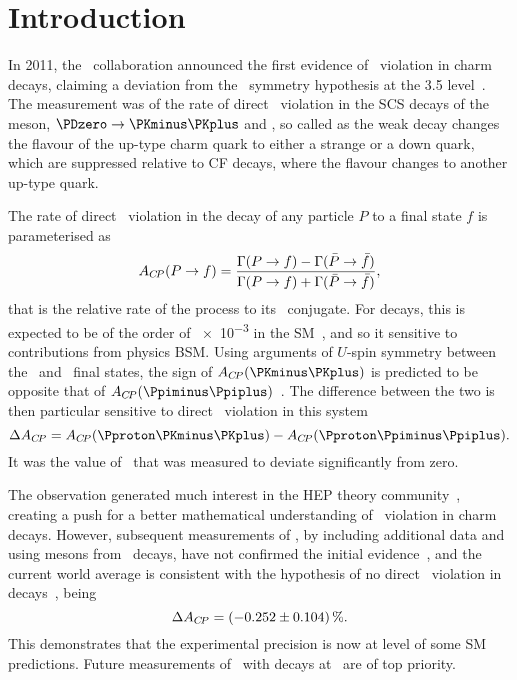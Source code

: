 \chapter{Introduction}
\label{chap:cpv:introduction}

In 2011, the \lhcb\ collaboration announced the first evidence of \CP\ 
violation in charm decays, claiming a deviation from the \CP\ symmetry 
hypothesis at the
\SI{3.5}{\sigma} level~\cite{Aaij:2011in}.
The measurement was of the rate of direct \CP\ violation in the \ac{SCS} decays 
of the \PDzero meson, $\decay{\PDzero}{\KmKp}$ and \pimpip, so called as the 
weak decay changes the flavour of the up-type charm quark to either a strange 
or a down quark, which are suppressed relative to \ac{CF} decays, where the 
flavour changes to another up-type quark.

The rate of direct \CP\ violation in the decay of any particle $P$ to a final 
state $f$ is parameterised as
\begin{equation}
  \ACP(\decay{P}{f}) = \frac{%
    \Gamma(\decay{P}{f}) - \Gamma(\decay{\bar{P}}{\bar{f}})
  }{%
    \Gamma(\decay{P}{f}) + \Gamma(\decay{\bar{P}}{\bar{f}})
  },
  \label{eqn:cpv:introduction:acp}
\end{equation}
that is the relative rate of the  process to its \CP\ conjugate.
For \decay{\PDzero}{\hmhp} decays, this is expected to be of the order of 
\num{e-3} in the \ac{SM}~\cite{Grossman:2006jg}, and so it sensitive to 
contributions from physics \acl{BSM}.
Using arguments of $U$-spin symmetry between the \KmKp\ and \pimpip\ final 
states, the sign of $\ACP(\KmKp)$ is predicted to be opposite that of 
$\ACP(\pimpip)$~\cite{Grossman:2006jg}.
The difference between the two is then particular sensitive to direct \CP\ 
violation in this system
\begin{equation}
  \dACP = \ACP(\pKK) - \ACP(\ppipi).
  \label{eqn:cpv:introduction:dacp_pure}
\end{equation}
It was the value of \dACP\ that was measured to deviate significantly from 
zero.

The observation generated much interest in the \acl{HEP} theory 
community~\cite{Lenz:2013pwa}, creating a push for a better mathematical 
understanding of \CP\ violation in charm decays.
However, subsequent measurements of \dACP, by including additional data and 
using \PDzero mesons from \PB\ decays, have not confirmed the initial 
evidence~\cite{Aaij:2014gsa,Aaij:2016cfh}, and the current world average is 
consistent with the hypothesis of no direct \CP\ violation in \PDzero 
decays~\cite{Amhis:2014hma}, being\footnotemark
\begin{equation}
  \dACP = \SI{-0.252 \pm 0.104}{\percent}.
  \label{eqn:cpv:introduction:dacp_world_average}
\end{equation}
This demonstrates that the experimental precision is now at level of some 
\ac{SM} predictions.
Future measurements of \dACP\ with \PDzero decays at \lhcb\ are of top 
priority.

